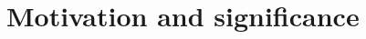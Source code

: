 \documentclass[preprint,12pt, a4paper]{elsarticle}
\begin{document}


\section{Motivation and significance}\label{sec:motivation}

\end{document}
